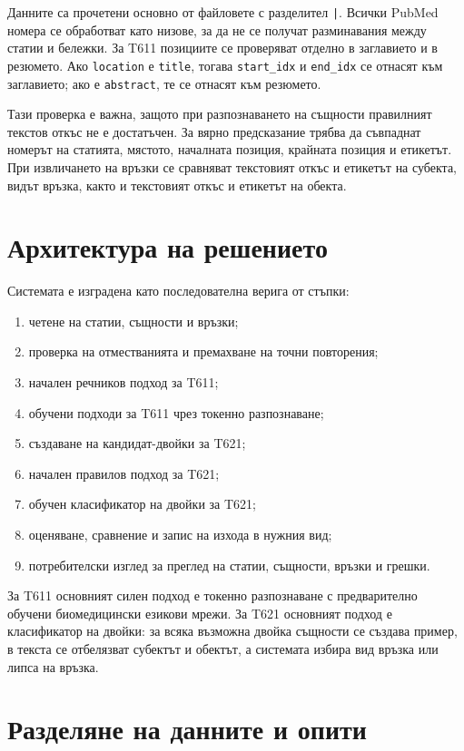 \documentclass[12pt,a4paper]{article}
\begin{document}
Данните са прочетени основно от файловете с разделител \texttt{|}. Всички PubMed номера се обработват като низове, за да не се получат разминавания между статии и бележки. За T611 позициите се проверяват отделно в заглавието и в резюмето. Ако \texttt{location} е \texttt{title}, тогава \texttt{start\_idx} и \texttt{end\_idx} се отнасят към заглавието; ако е \texttt{abstract}, те се отнасят към резюмето.

Тази проверка е важна, защото при разпознаването на същности правилният текстов откъс не е достатъчен. За вярно предсказание трябва да съвпаднат номерът на статията, мястото, началната позиция, крайната позиция и етикетът. При извличането на връзки се сравняват текстовият откъс и етикетът на субекта, видът връзка, както и текстовият откъс и етикетът на обекта.

\section{Архитектура на решението}

Системата е изградена като последователна верига от стъпки:

\begin{enumerate}
\item четене на статии, същности и връзки;
\item проверка на отместванията и премахване на точни повторения;
\item начален речников подход за T611;
\item обучени подходи за T611 чрез токенно разпознаване;
\item създаване на кандидат-двойки за T621;
\item начален правилов подход за T621;
\item обучен класификатор на двойки за T621;
\item оценяване, сравнение и запис на изхода в нужния вид;
\item потребителски изглед за преглед на статии, същности, връзки и грешки.
\end{enumerate}

За T611 основният силен подход е токенно разпознаване с предварително обучени биомедицински езикови мрежи. За T621 основният подход е класификатор на двойки: за всяка възможна двойка същности се създава пример, в текста се отбелязват субектът и обектът, а системата избира вид връзка или липса на връзка.

\section{Разделяне на данните и опити}
\end{document}

